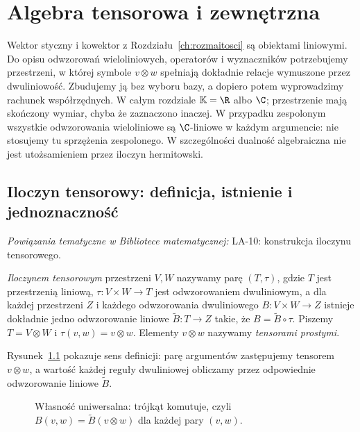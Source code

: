 \chapter{Algebra tensorowa i zewnętrzna}
\label{ch:algebra-tensorowa}

\providecommand{\atlasref}[2]{#2}


Wektor styczny i kowektor z Rozdziału~\ref{ch:rozmaitosci} są obiektami
liniowymi. Do opisu odwzorowań wieloliniowych, operatorów i
wyznaczników potrzebujemy przestrzeni, w której symbole
$v\otimes w$ spełniają dokładnie relacje wymuszone przez dwuliniowość.
Zbudujemy ją bez wyboru bazy, a dopiero potem wyprowadzimy rachunek
współrzędnych. W całym rozdziale $\mathbb K=\R$ albo $\C$;
przestrzenie mają skończony wymiar, chyba że zaznaczono inaczej.
W przypadku zespolonym wszystkie odwzorowania wieloliniowe są
$\C$-liniowe w każdym argumencie: nie stosujemy tu sprzężenia
zespolonego. W szczególności dualność algebraiczna nie jest
utożsamieniem przez iloczyn hermitowski.

\section{Iloczyn tensorowy: definicja, istnienie i jednoznaczność}
\label{sec:iloczyn-tensorowy}

\noindent\emph{Powiązania tematyczne w Bibliotece matematycznej:} \atlasref{LA-10::thm:lin10-istnienie}{LA-10: konstrukcja iloczynu tensorowego}.


\begin{definicja}
\label{def:tensor-universal}
\emph{Iloczynem tensorowym} przestrzeni $V,W$ nazywamy parę
$(T,\tau)$, gdzie $T$ jest przestrzenią liniową,
$\tau\colon V\times W\to T$ jest odwzorowaniem dwuliniowym,
a dla każdej przestrzeni $Z$ i każdego odwzorowania dwuliniowego
$B\colon V\times W\to Z$ istnieje dokładnie jedno odwzorowanie
liniowe $\widetilde B\colon T\to Z$ takie, że
$B=\widetilde B\circ\tau$. Piszemy $T=V\otimes W$ i
$\tau(v,w)=v\otimes w$. Elementy $v\otimes w$ nazywamy
\emph{tensorami prostymi}.
\end{definicja}

Rysunek~\ref{fig:tensor-wlasnosc-uniwersalna} pokazuje sens definicji:
parę argumentów zastępujemy tensorem $v\otimes w$, a wartość
każdej reguły dwuliniowej obliczamy przez odpowiednie
odwzorowanie liniowe $\widetilde B$.
\begin{figure}[H]
\centering
{}
\caption{Własność uniwersalna: trójkąt komutuje, czyli
$B(v,w)=\widetilde B(v\otimes w)$ dla każdej pary $(v,w)$.}
\label{fig:tensor-wlasnosc-uniwersalna}
\end{figure}

